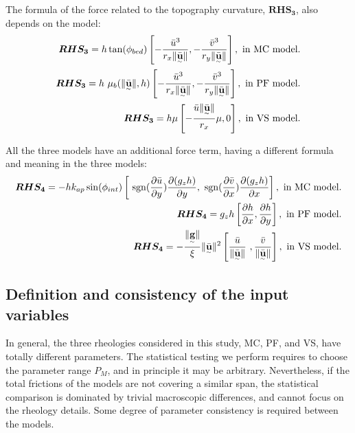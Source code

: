 \documentclass{article}
\begin{document}
The formula of the force related to the topography curvature, $\boldsymbol{RHS_3}$, also depends on the model:
\begin{align}
\boldsymbol{RHS_3} = h \tan(\phi_{bed})\left[-\frac{\bar{u}^3}{r_x\| \underset{^\sim}{\bar{\textbf{u}}} \|}, -\frac{\bar{v}^3}{r_y\| \underset{^\sim}{\bar{\textbf{u}}} \|}\right],\textmd{ in MC model.}\nonumber\\
\boldsymbol{RHS_3} = h\ \mu_{b}(\|\underset{^\sim}{\bar{\textbf{u}}} \|,h)\left[-\frac{\bar{u}^3}{r_x\| \underset{^\sim}{\bar{\textbf{u}}} \|}, -\frac{\bar{v}^3}{r_y\| \underset{^\sim}{\bar{\textbf{u}}} \|}\right],\textmd{ in PF model.}\\
\boldsymbol{RHS_3} = h \mu\left[- \frac{\bar{u}\| \underset{^\sim}{\bar{\textbf u}} \|}{r_{x}} \mu,0\right],\textmd{ in VS model.}\nonumber
\end{align}

All the three models have an additional force term, having a different formula and meaning in the three models:
\begin{align}
\boldsymbol{RHS_4} =  - h k_{ap}\sin(\phi_{int})\left[ \ {\rm sgn}(\frac{\partial \bar{u}}{\partial y}) \frac{\partial (g_z h)}{\partial y},\ {\rm sgn}({\frac{\partial \bar{v}}{\partial x}}) \frac{\partial (g_z h)}{\partial x}\right],\textmd{ in MC model.}\nonumber\\
\boldsymbol{RHS_4} = g_{z}h\left[\frac{\partial h}{\partial x}, \frac{\partial h}{\partial y}\right],\textmd{ in PF model.}\\
\boldsymbol{RHS_4} =  -\frac{\| \underset{^\sim}{\textbf g} \|}{\xi}\| \underset{^\sim}{\bar{\textbf u}} \|^2\left[\frac{\bar{u}}{\| \underset{^\sim}{\bar{\textbf u}}\|} \ ,\frac{\bar{v}}{\| \underset{^\sim}{\bar{\textbf u}}\|}\right],\textmd{ in VS model.}\nonumber
\end{align}

\newpage
\subsection{Definition and consistency of the input variables}\label{consistency}
In general, the three rheologies considered in this study, MC, PF, and VS, have totally different parameters. The statistical testing we perform requires to choose the parameter range $P_M$, and in principle it may be arbitrary. Nevertheless, if the total frictions of the models are not covering a similar span, the statistical comparison is dominated by trivial macroscopic differences, and cannot focus on the rheology details. Some degree of parameter consistency is required between the models.
\end{document}
